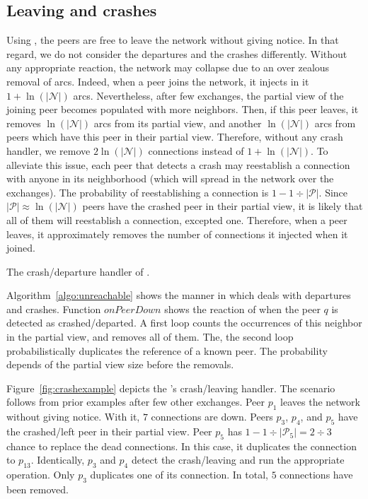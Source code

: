 \subsection{Leaving and crashes}
\label{subsec:leaving}

Using \SPRAY, the peers are free to leave the network without giving notice. In
that regard, we do not consider the departures and the crashes differently.
Without any appropriate reaction, the network may collapse due to an over
zealous removal of arcs. Indeed, when a peer joins the network, it injects in
it $1+\ln(|\mathcal{N}|)$ arcs. Nevertheless, after few exchanges, the partial
view of the joining peer becomes populated with more neighbors. Then, if this
peer leaves, it removes $\ln(|\mathcal{N}|)$ arcs from its partial view, and
another $\ln(|\mathcal{N}|)$ arcs from peers which have this peer in their
partial view. Therefore, without any crash handler, we remove
$2\ln(|\mathcal{N}|)$ connections instead of $1+\ln(|\mathcal{N}|)$. To
alleviate this issue, each peer that detects a crash may reestablish a
connection with anyone in its neighborhood (which will spread in the network
over the exchanges). The probability of reestablishing a connection is
$1-{1\div{|\mathcal{P}|}}$. Since ${|\mathcal{P}|}\approx \ln(|\mathcal{N}|)$
peers have the crashed peer in their partial view, it is likely that all of
them will reestablish a connection, excepted one. Therefore, when a peer
leaves, it approximately removes the number of connections it injected when it
joined.

\begin{algorithm}[h]
  
  \caption{\label{algo:unreachable}The crash/departure handler of \SPRAY.}
\end{algorithm}

Algorithm~\ref{algo:unreachable} shows the manner in which \SPRAY deals with
departures and crashes.  Function $onPeerDown$ shows the reaction of \SPRAY
when the peer $q$ is detected as crashed/departed. A first loop counts the
occurrences of this neighbor in the partial view, and removes all of them. The,
the second loop probabilistically duplicates the reference of a known peer. The
probability depends of the partial view size before the removals.

Figure~\ref{fig:crashexample} depicts the \SPRAY's crash/leaving handler. The
scenario follows from prior examples after few other exchanges. Peer $p_1$
leaves the network without giving notice. With it, $7$ connections are
down. Peers $p_3$, $p_4$, and $p_5$ have the crashed/left peer in their partial
view. Peer $p_5$ has $1-{1\div{|\mathcal{P}_5|}}={2\div{3}}$ chance to replace
the dead connections. In this case, it duplicates the connection to
$p_{13}$. Identically, $p_3$ and $p_4$ detect the crash/leaving and run the
appropriate operation. Only $p_3$ duplicates one of its connection. In total,
$5$ connections have been removed.

